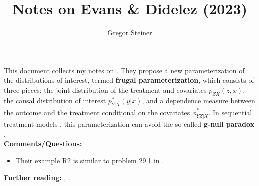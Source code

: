 \documentclass[10pt]{article}
\author{Gregor Steiner}
\title{Notes on Evans \& Didelez (2023)}
\begin{document}
\maketitle

This document collects my notes on \cite{evans_didelez_2023}. They propose a new parameterization of the distributions of interest, termed \textbf{frugal parameterization}, which consists of three pieces: the joint distribution of the treatment and covariates $p_{ZX}(z, x)$, the causal distribution of interest $p_{Y | X}^* (y|x)$, and a dependence measure between the outcome and the treatment conditional on the covariates $\phi_{YZ | X}^*$. In sequential treatment models \citep[see][Figure 2]{evans_didelez_2023}, this parameterization can avoid the so-called \textbf{g-null paradox} \citep{robins_wasserman_1997}. \\

\textbf{Comments/Questions:}
\begin{itemize}
	\item Their example R2 is similar to problem 29.1 in \cite{ding2023course}.
\end{itemize}

\textbf{Further reading:} \cite{robins_wasserman_1997}, \cite{mcgrath2022revisiting}.









\end{document}
